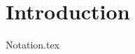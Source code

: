 \documentclass[../open-optimization/open-optimization.tex]{subfiles}
\begin{document}

\chapter*{Introduction}
{Notation.tex}


\end{document}
